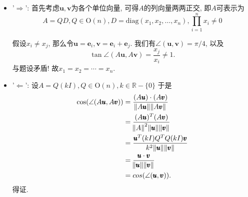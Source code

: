 \documentclass[a4paper,12pt]{ctexart}
\begin{document}
    \begin{itemize}
    \item '$\Rightarrow$': 首先考虑$\pmb{u}, \pmb{v}$为各个单位向量,
        可得$A$的列向量两两正交, 即$A$可表示为
        \begin{equation}
            A = QD, Q\in \mathrm{O}(n), D=\mathrm{diag}(x_1, x_2, \dotsc, x_n),
            \prod_{i=1}^n{x_i}\neq 0
        \end{equation}

        假设$x_i\neq x_j$, 那么令$\pmb{u}=\pmb{e}_i, \pmb{v}=\pmb{e}_i+\pmb{e}_j$.
        我们有$\angle(\pmb{u}, \pmb{v}) = \pi/4$, 以及
        \begin{equation}
            \tan{\angle(A\pmb{u}, A\pmb{v})} = \frac{x_j}{x_i} \neq 1.
        \end{equation}
        与题设矛盾! 故$x_1 = x_2 = \dotsb = x_n$.
    \item '$\Leftarrow$': 设$A=Q(kI), Q\in \mathrm{O}(n), k\in \mathbb{R}-\{0\}$
        于是
        \begin{align}
            \cos(\angle(A\pmb{u}, A\pmb{v}))
            &= \frac{(A\pmb{u})\cdot(A\pmb{v})}{\norm{A\pmb{u}}\norm{A\pmb{v}}}\\
            &= \frac{(A\pmb{u})^{T}(A\pmb{v})}{\norm{A}^2\norm{\pmb{u}}\norm{\pmb{v}}}\\
            &= \frac{\pmb{u}^{T}(kI)Q^{T}Q(kI)\pmb{v}}{k^2\norm{\pmb{u}}\norm{\pmb{v}}}\\
            &= \frac{\pmb{u}\cdot\pmb{v}}{\norm{\pmb{u}}\norm{\pmb{v}}}\\
            &= cos(\angle(\pmb{u}, \pmb{v})).
        \end{align}
        得证.
    \end{itemize}
\end{document}
